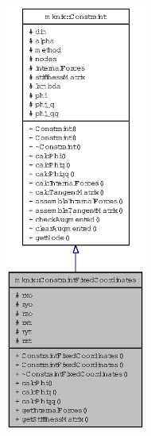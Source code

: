 \begin{figure}[H]
\begin{center}
\leavevmode
\includegraphics[height=400pt]{classmknix_1_1ConstraintFixedCoordinates__coll__graph}
\end{center}
\end{figure}
